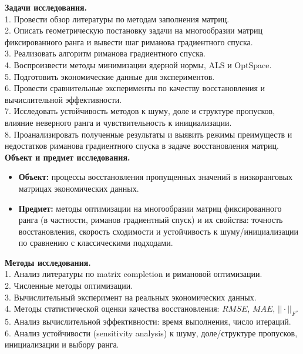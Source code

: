 \documentclass[a4paper,12pt]{article}
\begin{document}
\textbf{Задачи исследования.} \\[5pt]
1. Провести обзор литературы по методам заполнения матриц. \\[5pt]
2. Описать геометрическую постановку задачи на многообразии
матриц фиксированного ранга и вывести шаг риманова градиентного спуска. \\[5pt]
3. Реализовать алгоритм риманова градиентного спуска. \\[5pt]
4. Воспроизвести методы минимизации ядерной нормы, ALS и OptSpace. \\[5pt]
5. Подготовить экономические данные для экспериментов. \\[5pt]
6. Провести сравнительные эксперименты по качеству восстановления и вычислительной эффективности. \\[25pt]
7. Исследовать устойчивость методов к шуму, доле и структуре пропусков, влияние неверного ранга и чувствительность к
инициализации. \\[5pt]
8. Проанализировать полученные результаты и выявить режимы преимуществ и недостатков риманова градиентного спуска в задаче восстановления матриц. \\[5pt]
\textbf{Объект и предмет исследования.}
\begin{itemize}
    \item \textbf{Объект:} процессы восстановления пропущенных значений в низкоранговых матрицах экономических данных.
    \item \textbf{Предмет:} методы оптимизации на многообразии матриц фиксированного ранга (в частности, риманов градиентный спуск) и их свойства: точность восстановления, скорость сходимости и устойчивость к шуму/инициализации по сравнению с классическими подходами.
\end{itemize}
\textbf{Методы исследования.} \\[5pt]
1. Анализ литературы по matrix completion и римановой оптимизации. \\[5pt]
2. Численные методы оптимизации. \\[5pt]
3. Вычислительный эксперимент на реальных экономических данных. \\[5pt]
4. Методы статистической оценки качества восстановления: $RMSE$, $MAE$, $||\cdot||_F.$ \\[5pt]
5. Анализ вычислительной эффективности: время выполнения, число итераций. \\[5pt]
6. Анализ устойчивости (sensitivity analysis) к шуму, доле/структуре пропусков, инициализации и выбору ранга. \\[5pt]
\end{document}
